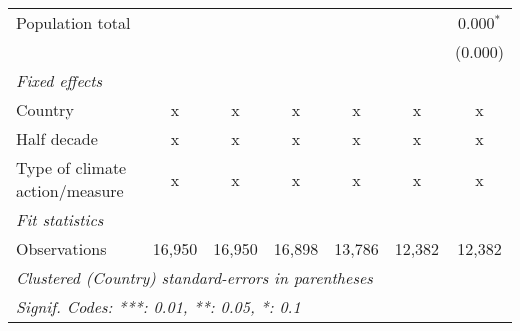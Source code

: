 \begin{tabular}{lcccccc}
   Population total                      &         &         &             &         &         & 0.000$^{*}$\\   
                                         &         &         &             &         &         & (0.000)\\   
   \emph{Fixed effects}\\
   Country                               & x       & x       & x           & x       & x       & x\\  
   Half decade                           & x       & x       & x           & x       & x       & x\\  
   Type of climate action/measure        & x       & x       & x           & x       & x       & x\\  
   \midrule \emph{Fit statistics}\\
   Observations                          & 16,950  & 16,950  & 16,898      & 13,786  & 12,382  & 12,382\\  
   \midrule
   \multicolumn{7}{l}{\emph{Clustered (Country) standard-errors in parentheses}}\\
   \multicolumn{7}{l}{\emph{Signif. Codes: ***: 0.01, **: 0.05, *: 0.1}}\\
\end{tabular}
\par\endgroup


